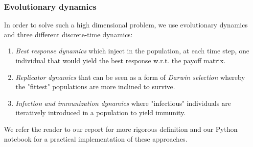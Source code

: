 \documentclass{beamer}
\begin{document}
\begin{frame}
    \frametitle{Evolutionary dynamics}
    In order to solve such a high dimensional problem, we use evolutionary dynamics and three different discrete-time dynamics:
    \begin{enumerate}
        \item \textit{Best response dynamics} which inject in the population, at each time step, one individual that would yield the best response w.r.t. the payoff matrix.
        \item \textit{Replicator dynamics} that can be seen as a form of \textit{Darwin selection} whereby the "fittest" populations are more inclined to survive.
        \item \textit{Infection and immunization dynamics} where "infectious" individuals are iteratively introduced in a population to yield immunity.
    \end{enumerate}
    We refer the reader to our report for more rigorous definition and our Python notebook for a practical implementation of these approaches.
\end{frame}
\end{document}
